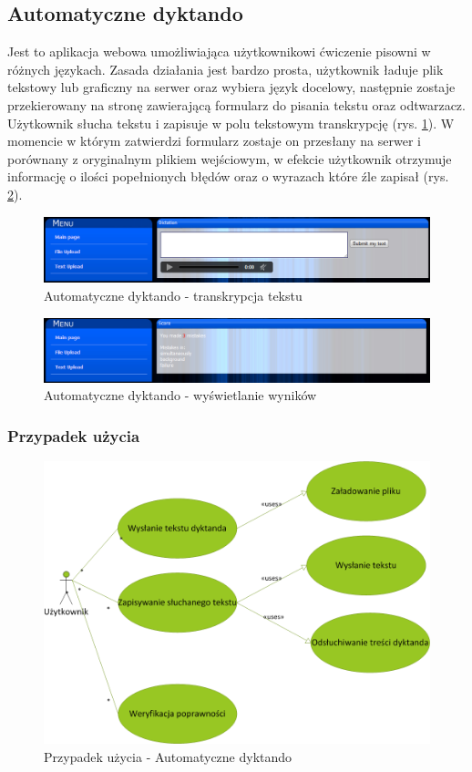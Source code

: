 \subsection{Automatyczne dyktando}
Jest to aplikacja webowa umożliwiająca użytkownikowi ćwiczenie pisowni w różnych językach. Zasada działania jest bardzo prosta, użytkownik ładuje plik tekstowy lub graficzny na serwer oraz wybiera język docelowy, następnie zostaje przekierowany na stronę zawierającą formularz do pisania tekstu oraz odtwarzacz. Użytkownik słucha tekstu i zapisuje w polu tekstowym transkrypcję (rys. \ref{fig:dictandoDictandoScreen}). W momencie w którym zatwierdzi formularz zostaje on przesłany na serwer i porównany z oryginalnym plikiem wejściowym, w efekcie użytkownik otrzymuje informację o ilości popełnionych błędów oraz o wyrazach które źle zapisał (rys. \ref{fig:dictandoScoreScreen}). 
\begin{figure}[!h]
	\centering
	\includegraphics[scale=0.37]{dictandoDictandoScreen.png} 
	\caption{Automatyczne dyktando - transkrypcja tekstu} \label{fig:dictandoDictandoScreen}
\end{figure}
\begin{figure}[!h]
	\centering
	\includegraphics[scale=0.45]{dictandoScoreScreen.png} 
	\caption{Automatyczne dyktando - wyświetlanie wyników} \label{fig:dictandoScoreScreen}
\end{figure}
\subsubsection{Przypadek użycia}
\begin{figure}[!h]
	\centering
	\includegraphics[scale=0.45]{useCaseDictando.png} 
	\caption{Przypadek użycia - Automatyczne dyktando }
\end{figure}


